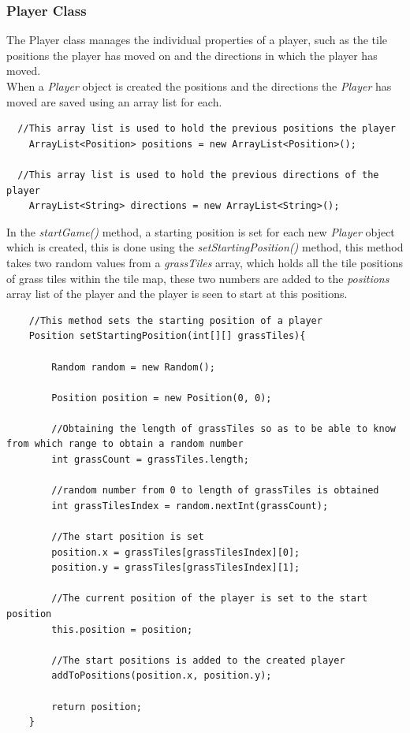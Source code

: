 \documentclass[a4paper,12pt]{extarticle}
\begin{document}
\newpage
\subsubsection{Player Class}
\noindent The Player class manages the individual properties of a player, such as the tile positions the player has moved on and the directions in which the player has moved.\\

\noindent When a \textit{Player} object is created the positions and the directions the \textit{Player} has moved are saved using an array list for each.

\begin{lstlisting}
  //This array list is used to hold the previous positions the player
    ArrayList<Position> positions = new ArrayList<Position>();

  //This array list is used to hold the previous directions of the player
    ArrayList<String> directions = new ArrayList<String>();
\end{lstlisting}
\vspace{4mm}

\noindent In the \textit{startGame()} method, a starting position is set for each new \textit{Player} object which is created, this is done using the \textit{setStartingPosition()} method, this method takes two random values from a \textit{grassTiles} array, which holds all the tile positions of grass tiles within the tile map, these two numbers are added to the \textit{positions} array list of the player and the player is seen to start at this positions.

\begin{lstlisting}
    //This method sets the starting position of a player
    Position setStartingPosition(int[][] grassTiles){

        Random random = new Random();

        Position position = new Position(0, 0);

        //Obtaining the length of grassTiles so as to be able to know from which range to obtain a random number
        int grassCount = grassTiles.length;

        //random number from 0 to length of grassTiles is obtained
        int grassTilesIndex = random.nextInt(grassCount);

        //The start position is set
        position.x = grassTiles[grassTilesIndex][0];
        position.y = grassTiles[grassTilesIndex][1];

        //The current position of the player is set to the start position
        this.position = position;

        //The start positions is added to the created player
        addToPositions(position.x, position.y);

        return position;
    }
\end{lstlisting}
\vspace{4mm}
\end{document}
